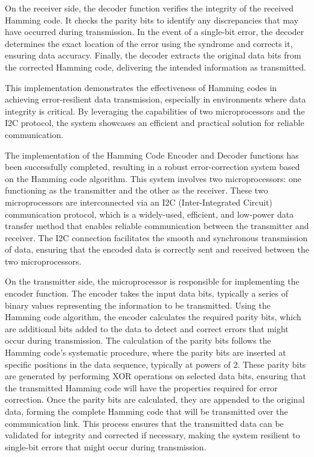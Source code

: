 \documentclass{article}
\numberwithin{equation}{section}
\numberwithin{figure}{section}
\numberwithin{table}{section}
\begin{document}
On the receiver side, the decoder function verifies the integrity of the received Hamming code. It checks the parity bits to identify any discrepancies that may have occurred during transmission. In the event of a single-bit error, the decoder determines the exact location of the error using the syndrome and corrects it, ensuring data accuracy. Finally, the decoder extracts the original data bits from the corrected Hamming code, delivering the intended information as transmitted.

This implementation demonstrates the effectiveness of Hamming codes in achieving error-resilient data transmission, especially in environments where data integrity is critical. By leveraging the capabilities of two microprocessors and the I2C protocol, the system showcases an efficient and practical solution for reliable communication.

The implementation of the Hamming Code Encoder and Decoder functions has been successfully completed, resulting in a robust error-correction system based on the Hamming code algorithm. This system involves two microprocessors: one functioning as the transmitter and the other as the receiver. These two microprocessors are interconnected via an I2C (Inter-Integrated Circuit) communication protocol, which is a widely-used, efficient, and low-power data transfer method that enables reliable communication between the transmitter and receiver. The I2C connection facilitates the smooth and synchronous transmission of data, ensuring that the encoded data is correctly sent and received between the two microprocessors.

On the transmitter side, the microprocessor is responsible for implementing the encoder function. The encoder takes the input data bits, typically a series of binary values representing the information to be transmitted. Using the Hamming code algorithm, the encoder calculates the required parity bits, which are additional bits added to the data to detect and correct errors that might occur during transmission. The calculation of the parity bits follows the Hamming code's systematic procedure, where the parity bits are inserted at specific positions in the data sequence, typically at powers of 2. These parity bits are generated by performing XOR operations on selected data bits, ensuring that the transmitted Hamming code will have the properties required for error correction. Once the parity bits are calculated, they are appended to the original data, forming the complete Hamming code that will be transmitted over the communication link. This process ensures that the transmitted data can be validated for integrity and corrected if necessary, making the system resilient to single-bit errors that might occur during transmission.
\end{document}
